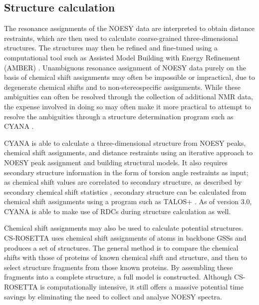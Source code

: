 \subsection*{Structure calculation}
The resonance assignments of the NOESY data are 
interpreted to obtain distance restraints, which are then used to calculate 
coarse-grained three-dimensional structures.  The structures may then be 
refined and fine-tuned using a computational tool such as 
Assisted Model Building with Energy Refinement (AMBER) \cite{amber}.  
Unambiguous resonance assignment of NOESY data purely on the basis of chemical 
shift assignments may often be impossible or impractical, due to degenerate 
chemical shifts and to non-stereospecific assignments.  While these 
ambiguities can often be resolved through the collection of additional 
NMR data, the expense involved in doing so may often make it more practical 
to attempt to resolve the ambiguities through a structure determination 
program such as CYANA \cite{cyana2004}.

CYANA is able to calculate a three-dimensional structure from NOESY peaks, 
chemical shift assignments, and distance restraints \cite{cyana2004, aria2003} 
using an iterative approach to NOESY peak assignment and building structural 
models.  It also requires secondary structure information in the form of 
torsion angle restraints as input; as
chemical shift values are correlated to secondary structure, as described
by secondary chemical shift statistics \cite{spera1991empirical}, secondary 
structure can be calculated from chemical shift assignments using a program 
such as TALOS+ \cite{talos+}.  As of version 3.0, CYANA is able to make use
of RDCs during structure calculation as well.

Chemical shift assignments may also be used to calculate potential structures.
CS-ROSETTA \cite{cs-rosetta} uses chemical shift assignments of atoms in 
backbone GSSs and produces a set of structures.  The general method is to 
compare the chemical shifts with those of proteins of known chemical shift
and structure, and then to select structure fragments from those known 
proteins.  By assembling these fragments into a complete structure, a full
model is constructed.  Although CS-ROSETTA is computationally intensive, it
still offers a massive potential time savings by eliminating the need to
collect and analyse NOESY spectra.

